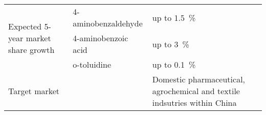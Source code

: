 \begin{landscape}
\begin{table}[h]
\begin{tabular}{@{}lll@{}}
\multirow{3}{*}{Expected 5-year market share growth} & 4-aminobenzaldehyde & up to \SI{1.5}{\percent}                                                                                                                                                                                                                                                                                                                                                                                                           \\ \cmidrule(l){2-3} 
                                                     & 4-aminobenzoic acid & up to \SI{3}{\percent}                                                                                                                                                                                                                                                                                                                                                                                                             \\ \cmidrule(l){2-3} 
                                                     & o-toluidine         & up to \SI{0.1}{\percent}                                                                                                                                                                                                                                                                                                                                                                                                           \\ \midrule
\multicolumn{2}{l}{Target market}                                        & Domestic pharmaceutical, agrochemical and textile indsutries within China                                                                                                                                                                                                                                                                                                                                             \\ \bottomrule
\end{tabular}
\end{table}

\end{landscape}